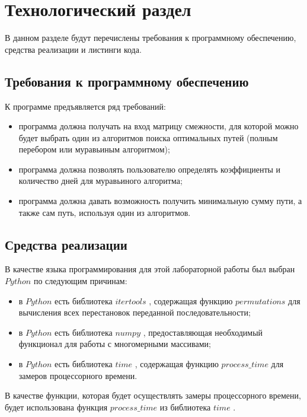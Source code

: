 \chapter{Технологический раздел}

В данном разделе будут перечислены требования к программному обеспечению, средства реализации и листинги кода.

\section{Требования к программному обеспечению}

К программе предъявляется ряд требований:

\begin{itemize} [label=--]
	\item программа должна получать на вход матрицу смежности, для которой можно будет выбрать один из алгоритмов поиска оптимальных
	путей (полным перебором или муравьиным алгоритмом);
	\item программа должна позволять пользователю определять коэффициенты и количество дней для муравьиного алгоритма;
	\item программа должна давать возможность получить минимальную сумму пути, а также сам путь, используя один из алгоритмов.
\end{itemize}

\section{Средства реализации}

В качестве языка программирования для этой лабораторной работы был выбран $Python$ \cite{info_pl} по следующим причинам:

\begin{itemize}[label=--]
	\item в $Python$ есть библиотека $itertools$ \cite{info_itertools}, содержащая функцию $permutations$ для вычисления всех перестановок переданной последовательности;
	\item в $Python$ есть библиотека $numpy$ \cite{info_numpy}, предоставляющая необходимый функционал для работы с многомерными массивами;
	\item в $Python$ есть библиотека $time$ \cite{info_cpu_time_func}, содержащая функцию $process\_time$ для замеров процессорного времени.
\end{itemize}

В качестве функции, которая будет осуществлять замеры процессорного времени, будет использована функция $process\_time$ из библиотека $time$ \cite{info_cpu_time_func}.

